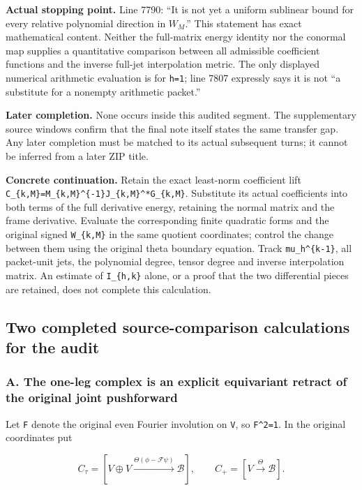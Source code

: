 \textbf{Actual stopping point.} Line 7790: ``It is not yet a uniform
sublinear bound for every relative polynomial direction in \(W_M\).''
This statement has exact mathematical content. Neither the full-matrix
energy identity nor the conormal map supplies a quantitative comparison
between all admissible coefficient functions and the inverse full-jet
interpolation metric. The only displayed numerical arithmetic evaluation
is for \texttt{h=1}; line 7807 expressly says it is not ``a substitute
for a nonempty arithmetic packet.''

\textbf{Later completion.} None occurs inside this audited segment. The
supplementary source windows confirm that the final note itself states
the same transfer gap. Any later completion must be matched to its
actual subsequent turns; it cannot be inferred from a later ZIP title.

\textbf{Concrete continuation.} Retain the exact least-norm coefficient
lift \texttt{C\_\{k,M\}=M\_\{k,M\}\^{}\{-1\}J\_\{k,M\}\^{}*G\_\{k,M\}}.
Substitute its actual coefficients into both terms of the full
derivative energy, retaining the normal matrix and the frame derivative.
Evaluate the corresponding finite quadratic forms and the original
signed \texttt{W\_\{k,M\}} in the same quotient coordinates; control the
change between them using the original theta boundary equation. Track
\texttt{mu\_h\^{}\{k-1\}}, all packet-unit jets, the polynomial degree,
tensor degree and inverse interpolation matrix. An estimate of
\texttt{I\_\{h,k\}} alone, or a proof that the two differential pieces
are retained, does not complete this calculation.

\subsection{Two completed source-comparison calculations for the
audit}\label{two-completed-source-comparison-calculations-for-the-audit}

\subsubsection{A. The one-leg complex is an explicit equivariant retract
of the original joint
pushforward}\label{a.-the-one-leg-complex-is-an-explicit-equivariant-retract-of-the-original-joint-pushforward}

Let \texttt{F} denote the original even Fourier involution on
\texttt{V}, so \texttt{F\^{}2=1}. In the original coordinates put

\[
C_\tau=[V\oplus V\xrightarrow{\Theta(\phi-\mathcal F\psi)}\mathscr B],
\qquad C_+=[V\xrightarrow\Theta\mathscr B].
\]

